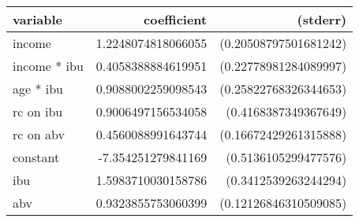 \begin{tabular}{lrr}
\textbf{variable}&\textbf{coefficient}&\textbf{(stderr)}\\
\hline

income&1.2248074818066055&(0.20508797501681242)\\
income * ibu&0.4058388884619951&(0.22778981284089997)\\
age * ibu&0.9088002259098543&(0.25822768326344653)\\
rc on ibu&0.9006497156534058&(0.4168387349367649)\\
rc on abv&0.4560088991643744&(0.16672429261315888)\\
constant&-7.354251279841169&(0.5136105299477576)\\
ibu&1.5983710030158786&(0.3412539263244294)\\
abv&0.9323855753060399&(0.12126846310509085)\\
\end{tabular}

